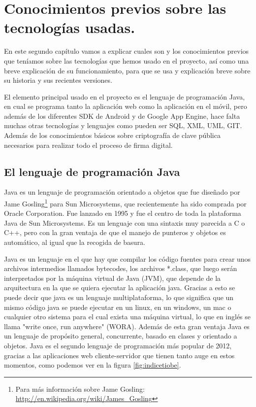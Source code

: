 \chapter[Conocimientos previos]{Conocimientos previos sobre las tecnologías usadas.}

En este segundo capítulo vamos a explicar cuales son y los conocimientos previos que teníamos sobre las tecnologías que hemos usado en el proyecto, así como una breve explicación de su funcionamiento, para que se usa y explicación breve sobre su historia y sus recientes versiones.

El elemento principal usado en el proyecto es el lenguaje de programación Java, en cual se programa tanto la aplicación web como la aplicación en el móvil, pero además de los diferentes SDK de Android y de Google App Engine, hace falta muchas otras tecnologías y lenguajes como pueden ser SQL, XML, UML, GIT. Además de los conocimientos básicos sobre criptografía de clave pública necesarios para realizar todo el proceso de firma digital.   

\section{El lenguaje de programación Java}

Java es un lenguaje de programación orientado a objetos que fue diseñado por Jame Gosling\footnote{Para más información sobre Jame Gosling: \url{http://en.wikipedia.org/wiki/James\_Gosling}} para Sun Microsystems, que recientemente ha sido comprada por Oracle Corporation. Fue lanzado en 1995 y fue el centro de toda la plataforma Java de Sun Microsystems. Es un lenguaje con una sintaxis muy parecida a C o C++, pero con la gran ventaja de que el manejo de punteros y objetos es automático, al igual que la recogida de basura.

Java es un lenguaje en el que hay que compilar los código fuentes para crear unos archivos intermedios llamados bytecodes, los archivos *.class, que luego serán interpretados por la máquina virtual de Java (JVM), que depende de la arquitectura en la que se quiera ejecutar la aplicación java. Gracias a esto se puede decir que java es un lenguaje multiplataforma, lo que significa que un mismo código java se puede ejecutar en un linux, en un windows, un mac o cualquier otro sistema para el cual exista una máquina virtual, lo que en inglés se llama "write once, run anywhere" (WORA). Además de esta gran ventaja Java es un lenguaje de propósito general, concurrente, basado en clases y orientado a objetos. Java es el segundo lenguaje de programación más popular de 2012, gracias a las aplicaciones web cliente-servidor que tienen tanto auge en estos momentos, como podemos ver en la figura \ref{fig:indicetiobe}.

